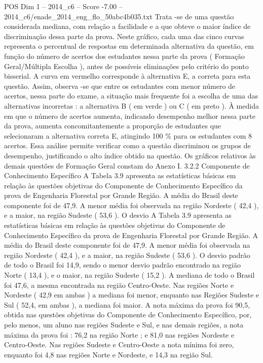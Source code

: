 \begin{textsample}{POS Dim 1 – 2014\_c6 – Score -7.00 – 2014\_c6/enade\_2014\_eng\_flo\_50abc4b035.txt}
Trata -se de uma questão considerada mediana, com relação a facilidade e a que obteve o maior índice de discriminação dessa parte da prova.
Neste gráfico, cada uma das cinco curvas representa o percentual de respostas em determinada alternativa da questão, em função do número de acertos dos estudantes nessa parte da prova ( Formação Geral/Múltipla Escolha ), antes de possíveis eliminações pelo critério do ponto bisserial.
A curva em vermelho corresponde à alternativa E, a correta para esta questão.
Assim, observa -se que entre os estudantes com menor número de acertos, nessa parte do exame, a situação mais frequente foi a escolha de uma das alternativas incorretas : a alternativa B ( em verde ) ou C ( em preto ).
À medida em que o número de acertos aumenta, indicando desempenho melhor nessa parte da prova, aumenta concomitantemente a proporção de estudantes que selecionaram a alternativa correta E, atingindo 100 \% para os estudantes com 8 acertos.
Essa análise permite verificar como a questão discriminou os grupos de desempenho, justificando o alto índice obtido na questão.
Os gráficos relativos às demais questões de Formação Geral constam do Anexo I. 3.2.2 Componente de Conhecimento Específico A Tabela 3.9 apresenta as estatísticas básicas em relação às questões objetivas do Componente de Conhecimento Específico da prova de Engenharia Florestal por Grande Região.
A média do Brasil deste componente foi de 47,9.
A menor média foi observada na região Nordeste ( 42,4 ), e a maior, na região Sudeste ( 53,6 ).
O desvio A Tabela 3.9 apresenta as estatísticas básicas em relação às questões objetivas do Componente de Conhecimento Específico da prova de Engenharia Florestal por Grande Região.
A média do Brasil deste componente foi de 47,9.
A menor média foi observada na região Nordeste ( 42,4 ), e a maior, na região Sudeste ( 53,6 ).
O desvio padrão de todo o Brasil foi 14,9, sendo o menor desvio padrão encontrado na região Norte ( 13,4 ), e o maior, na região Sudeste ( 15,2 ).
A mediana de todo o Brasil foi 47,6, a mesma encontrada na região Centro-Oeste.
Nas regiões Norte e Nordeste ( 42,9 em ambas ) a mediana foi menor, enquanto nas Regiões Sudeste e Sul ( 52,4, em ambas ), a mediana foi maior.
A nota máxima da prova foi 90,5, obtida nas questões objetivas do Componente de Conhecimento Específico, por, pelo menos, um aluno nas regiões Sudeste e Sul, e nas demais regiões, a nota máxima da prova foi : 76,2 na região Norte ; e 81,0 nas regiões Nordeste e Centro-Oeste.
Nas regiões Sudeste e Centro-Oeste a nota mínima foi zero, enquanto foi 4,8 nas regiões Norte e Nordeste, e 14,3 na região Sul.

\end{textsample}
